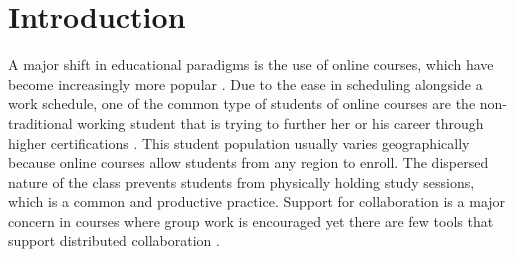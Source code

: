 \documentclass{sig-alternate}
\begin{document}




%
% 
% 
% 
% 
% 
% 



\section{Introduction}
A major shift in educational paradigms is the use of online courses,
which have become increasingly more popular \cite{BELLER,DOE}.  Due to
the ease in scheduling alongside a work schedule, one of the common
type of students of online courses are the non-traditional working
student that is trying to further her or his career through higher
certifications \cite{BURGESS:TRENDS}.  This student population usually
varies geographically because online courses allow students from any
region to enroll.  The dispersed nature of the class prevents students
from physically holding study sessions, which is a common and
productive practice.  Support for collaboration is a major concern in
courses where group work is encouraged \cite{WELLS:COLLAB} yet there
are few tools that support distributed collaboration
\cite{BURGESS:TRENDS}.
\end{document}

